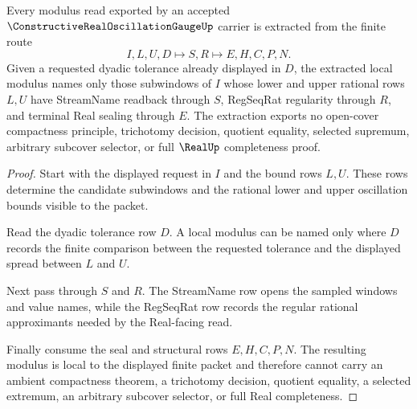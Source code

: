 \begin{theorem}
\label{thm:constructive-real-oscillation-gauge-modulus-extraction}
Every modulus read exported by an accepted $\ConstructiveRealOscillationGaugeUp$ carrier is extracted from the finite route
$$
I,L,U,D \longmapsto S,R \longmapsto E,H,C,P,N .
$$
Given a requested dyadic tolerance already displayed in $D$, the extracted local modulus names only those subwindows of $I$ whose lower and upper rational rows $L,U$ have StreamName readback through $S$, RegSeqRat regularity through $R$, and terminal Real sealing through $E$. The extraction exports no open-cover compactness principle, trichotomy decision, quotient equality, selected supremum, arbitrary subcover selector, or full $\RealUp$ completeness proof.
\end{theorem}
\begin{proof}
Start with the displayed request in $I$ and the bound rows $L,U$. These rows determine the candidate subwindows and the rational lower and upper oscillation bounds visible to the packet.

Read the dyadic tolerance row $D$. A local modulus can be named only where $D$ records the finite comparison between the requested tolerance and the displayed spread between $L$ and $U$.

Next pass through $S$ and $R$. The StreamName row opens the sampled windows and value names, while the RegSeqRat row records the regular rational approximants needed by the Real-facing read.

Finally consume the seal and structural rows $E,H,C,P,N$. The resulting modulus is local to the displayed finite packet and therefore cannot carry an ambient compactness theorem, a trichotomy decision, quotient equality, a selected extremum, an arbitrary subcover selector, or full Real completeness.
\end{proof}


